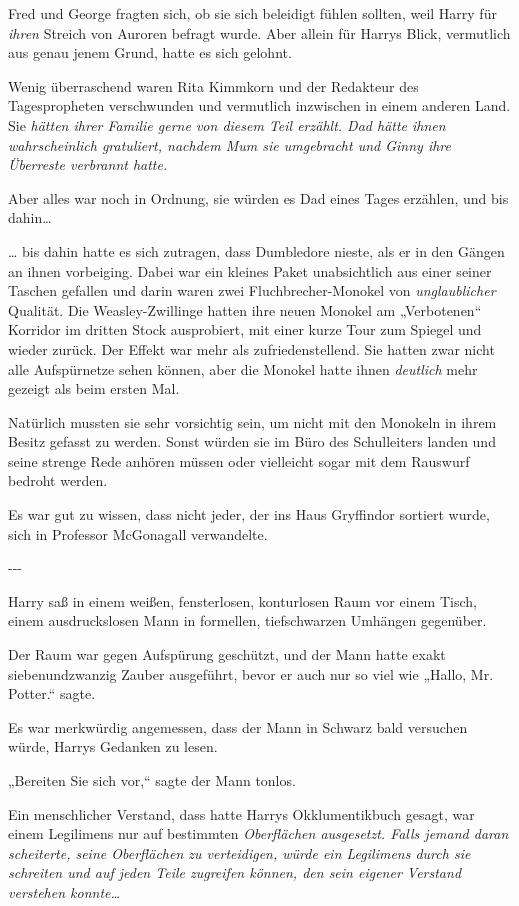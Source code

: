 {Fred und George fragten sich, ob sie sich beleidigt fühlen sollten, weil Harry für \emph{ihren} Streich von Auroren befragt wurde. Aber allein für Harrys Blick, vermutlich aus genau jenem Grund, hatte es sich gelohnt.

Wenig überraschend waren Rita Kimmkorn und der Redakteur des Tagespropheten verschwunden und vermutlich inzwischen in einem anderen Land. Sie \emph{hätten ihrer Familie gerne von diesem Teil erzählt. Dad hätte ihnen wahrscheinlich gratuliert, nachdem Mum sie umgebracht und Ginny ihre Überreste verbrannt hatte.}

Aber alles war noch in Ordnung, sie würden es Dad eines Tages erzählen, und bis dahin…

… bis dahin hatte es sich zutragen, dass Dumbledore nieste, als er in den Gängen an ihnen vorbeiging. Dabei war ein kleines Paket unabsichtlich aus einer seiner Taschen gefallen und darin waren zwei Fluchbrecher-Monokel von \emph{unglaublicher} Qualität. Die Weasley-Zwillinge hatten ihre neuen Monokel am „Verbotenen“ Korridor im dritten Stock ausprobiert, mit einer kurze Tour zum Spiegel und wieder zurück. Der Effekt war mehr als zufriedenstellend. Sie hatten zwar nicht alle Aufspürnetze sehen können, aber die Monokel hatte ihnen \emph{deutlich} mehr gezeigt als beim ersten Mal.

Natürlich mussten sie sehr vorsichtig sein, um nicht mit den Monokeln in ihrem Besitz gefasst zu werden. Sonst würden sie im Büro des Schulleiters landen und seine strenge Rede anhören müssen oder vielleicht sogar mit dem Rauswurf bedroht werden.

Es war gut zu wissen, dass nicht jeder, der ins Haus Gryffindor sortiert wurde, sich in Professor McGonagall verwandelte.

-\/-\/-

Harry saß in einem weißen, fensterlosen, konturlosen Raum vor einem Tisch, einem ausdruckslosen Mann in formellen, tiefschwarzen Umhängen gegenüber.

Der Raum war gegen Aufspürung geschützt, und der Mann hatte exakt siebenundzwanzig Zauber ausgeführt, bevor er auch nur so viel wie „Hallo, Mr. Potter.“ sagte.

Es war merkwürdig angemessen, dass der Mann in Schwarz bald versuchen würde, Harrys Gedanken zu lesen.

„Bereiten Sie sich vor,“ sagte der Mann tonlos.

Ein menschlicher Verstand, dass hatte Harrys Okklumentikbuch gesagt, war einem Legilimens nur auf bestimmten \emph{Oberflächen ausgesetzt. Falls jemand daran scheiterte, seine Oberflächen zu verteidigen, würde ein Legilimens \emph{durch} sie schreiten und auf jeden Teile zugreifen können, den sein eigener Verstand verstehen konnte…}

}
